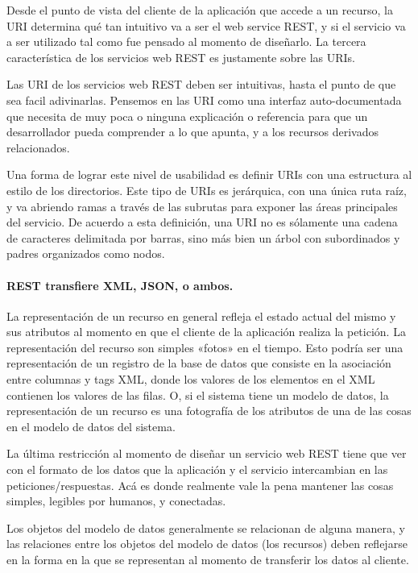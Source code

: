       Desde el punto de vista del cliente de la aplicación que accede a un recurso, la URI determina qué tan intuitivo va a ser el web service REST, y si el servicio va a ser utilizado tal como fue pensado al momento de diseñarlo. La tercera característica de los servicios web REST es justamente sobre las URIs.

      Las URI de los servicios web REST deben ser intuitivas, hasta el punto de que sea facil adivinarlas. Pensemos en las URI como una interfaz auto-documentada que necesita de muy poca o ninguna explicación o referencia para que un desarrollador pueda comprender a lo que apunta, y a los recursos derivados relacionados.

      Una forma de lograr este nivel de usabilidad es definir URIs con una estructura al estilo de los directorios. Este tipo de URIs es jerárquica, con una única ruta raíz, y va abriendo ramas a través de las subrutas para exponer las áreas principales del servicio. De acuerdo a esta definición, una URI no es sólamente una cadena de caracteres delimitada por barras, sino más bien un árbol con subordinados y padres organizados como nodos.
      
      
      \paragraph{REST transfiere XML, JSON, o ambos.} %
      \label{par:rest_transfiere_xml_json_o_ambos}
        La representación de un recurso en general refleja el estado actual del mismo y sus atributos al momento en que el cliente de la aplicación realiza la petición. La representación del recurso son simples «fotos» en el tiempo. Esto podría ser una representación de un registro de la base de datos que consiste en la asociación entre columnas y tags XML, donde los valores de los elementos en el XML contienen los valores de las filas. O, si el sistema tiene un modelo de datos, la representación de un recurso es una fotografía de los atributos de una de las cosas en el modelo de datos del sistema. 

        La última restricción al momento de diseñar un servicio web REST tiene que ver con el formato de los datos que la aplicación y el servicio intercambian en las peticiones/respuestas. Acá es donde realmente vale la pena mantener las cosas simples, legibles por humanos, y conectadas.

        Los objetos del modelo de datos generalmente se relacionan de alguna manera, y las relaciones entre los objetos del modelo de datos (los recursos) deben reflejarse en la forma en la que se representan al momento de transferir los datos al cliente.
      

